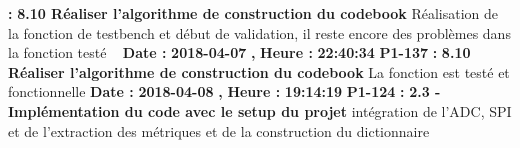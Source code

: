\documentclass{article}%
\begin{document}
\textbf{ : }%
\textbf{ 8.10 Réaliser l'algorithme de construction du codebook}%
\newline%
\newline%
%
Réalisation de la fonction de testbench et début de validation, il reste encore des problèmes dans la fonction testé\newline%
~\newline%
\newline%
%
\textbf{Date : }%
\textbf{2018{-}04{-}07}%
\textbf{,}%
\textbf{ Heure : }%
\textbf{22:40:34}%
\newline%
%
\textbf{P1{-}137 }%
\textbf{ : }%
\textbf{ 8.10 Réaliser l'algorithme de construction du codebook}%
\newline%
\newline%
%
La fonction est testé et fonctionnelle\newline%
\newline%
%
\textbf{Date : }%
\textbf{2018{-}04{-}08}%
\textbf{,}%
\textbf{ Heure : }%
\textbf{19:14:19}%
\newline%
%
\textbf{P1{-}124 }%
\textbf{ : }%
\textbf{ 2.3 {-} Implémentation du code avec le setup du projet}%
\newline%
\newline%
%
intégration de l'ADC, SPI et de l'extraction des métriques et de la construction du dictionnaire\newline%
\newline%
%
\newpage

%
\end{document}
